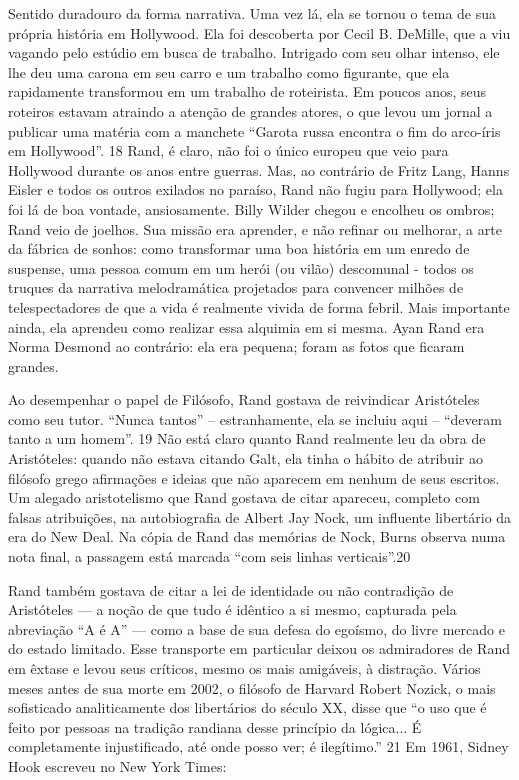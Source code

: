 Sentido duradouro da forma narrativa. Uma vez lá, ela se tornou o tema de sua própria história em Hollywood. Ela foi descoberta por Cecil B. DeMille, que a viu vagando pelo estúdio em busca de trabalho. Intrigado com seu olhar intenso, ele lhe deu uma carona em seu carro e um trabalho como figurante, que ela rapidamente transformou em um trabalho de roteirista. Em poucos anos, seus roteiros estavam atraindo a atenção de grandes atores, o que levou um jornal a publicar uma matéria com a manchete “Garota russa encontra o fim do arco-íris em Hollywood”. {\color{blue}18} Rand, é claro, não foi o único europeu que veio para Hollywood durante os anos entre guerras. Mas, ao contrário de Fritz Lang, Hanns Eisler e todos os outros exilados no paraíso, Rand não fugiu para Hollywood; ela foi lá de boa vontade, ansiosamente. Billy Wilder chegou e encolheu os ombros; Rand veio de joelhos. Sua missão era aprender, e não refinar ou melhorar, a arte da fábrica de sonhos: como transformar uma boa história em um enredo de suspense, uma pessoa comum em um herói (ou vilão) descomunal - todos os truques da narrativa melodramática projetados para convencer milhões de telespectadores de que a vida é realmente vivida de forma febril. Mais importante ainda, ela aprendeu como realizar essa alquimia em si mesma. Ayan Rand era Norma Desmond ao contrário: ela era pequena; foram as fotos que ficaram grandes.
 \par 
Ao desempenhar o papel de Filósofo, Rand gostava de reivindicar Aristóteles como seu tutor. “Nunca tantos” – estranhamente, ela se incluiu aqui – “deveram tanto a um homem”. {\color{blue}19} Não está claro quanto Rand realmente leu da obra de Aristóteles: quando não estava citando Galt, ela tinha o hábito de atribuir ao filósofo grego afirmações e ideias que não aparecem em nenhum de seus escritos. Um alegado aristotelismo que Rand gostava de citar apareceu, completo com falsas atribuições, na autobiografia de Albert Jay Nock, um influente libertário da era do New Deal. Na cópia de Rand das memórias de Nock, Burns observa numa nota final, a passagem está marcada “com seis linhas verticais”.{\color{blue}20}
 \par 
Rand também gostava de citar a lei de identidade ou não contradição de Aristóteles — a noção de que tudo é idêntico a si mesmo, capturada pela abreviação “A é A” — como a base de sua defesa do egoísmo, do livre mercado e do estado limitado. Esse transporte em particular deixou os admiradores de Rand em êxtase e levou seus críticos, mesmo os mais amigáveis, à distração. Vários meses antes de sua morte em 2002, o filósofo de Harvard Robert Nozick, o mais sofisticado analiticamente dos libertários do século XX, disse que “o uso que é feito por pessoas na tradição randiana desse princípio da lógica... É completamente injustificado, até onde posso ver; é ilegítimo.” {\color{blue}21} Em 1961, Sidney Hook escreveu no New York Times:
